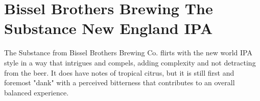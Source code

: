 \documentclass[10pt,oneside]{scrbook}
\begin{document}
\pagebreak

\begin{ingredientsblock}

\begin{malts}
\end{malts}

\begin{hops}
\end{hops}

\begin{yeasts}
\end{yeasts}

\end{ingredientsblock}

\chapter*{Bissel Brothers Brewing The Substance New England IPA}

\begin{aboutblock}
The Substance from Bissel Brothers Brewing Co. flirts with the new world IPA style in a way
that intrigues and compels, adding complexity and not detracting from the beer. It does have
notes of tropical citrus, but it is still first and foremost "dank" with a perceived bitterness
that contributes to an overall balanced experience.
\end{aboutblock}


\begin{methodandtiming}
 
\begin{mashsteps}
\end{mashsteps}

\begin{fermentationsteps}
\end{fermentationsteps}

\end{methodandtiming}

\pagebreak
\end{document}
